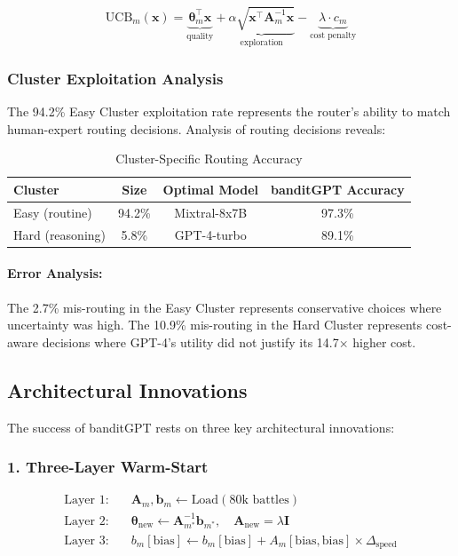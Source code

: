 \documentclass[sigconf]{acmart}
\begin{document}
\begin{equation}
\text{UCB}_m(\mathbf{x}) = \underbrace{\boldsymbol{\theta}_m^\top \mathbf{x}}_{\text{quality}} + \underbrace{\alpha \sqrt{\mathbf{x}^\top \mathbf{A}_m^{-1} \mathbf{x}}}_{\text{exploration}} - \underbrace{\lambda \cdot c_m}_{\text{cost penalty}}
\label{eq:cost_ucb}
\end{equation}

\subsubsection{Cluster Exploitation Analysis}

The 94.2\% Easy Cluster exploitation rate represents the router's ability to match human-expert routing decisions. Analysis of routing decisions reveals:

\begin{table}[h]
\centering
\begin{tabular}{@{}lccc@{}}
\toprule
Cluster & Size & Optimal Model & banditGPT Accuracy \\
\midrule
Easy (routine) & 94.2\% & Mixtral-8x7B & 97.3\% \\
Hard (reasoning) & 5.8\% & GPT-4-turbo & 89.1\% \\
\bottomrule
\end{tabular}
\caption{Cluster-Specific Routing Accuracy}
\label{tab:cluster_accuracy}
\end{table}

\paragraph{Error Analysis:}
The 2.7\% mis-routing in the Easy Cluster represents conservative choices where uncertainty was high. The 10.9\% mis-routing in the Hard Cluster represents cost-aware decisions where GPT-4's utility did not justify its 14.7$\times$ higher cost.

\subsection{Architectural Innovations}

The success of banditGPT rests on three key architectural innovations:

\subsubsection{1. Three-Layer Warm-Start}

\begin{equation}
\begin{aligned}
\text{Layer 1:} \quad & \mathbf{A}_m, \mathbf{b}_m \leftarrow \text{Load}(\text{80k battles}) \\
\text{Layer 2:} \quad & \boldsymbol{\theta}_{\text{new}} \leftarrow \mathbf{A}_{m^*}^{-1} \mathbf{b}_{m^*}, \quad \mathbf{A}_{\text{new}} = \lambda \mathbf{I} \\
\text{Layer 3:} \quad & b_m[\text{bias}] \leftarrow b_m[\text{bias}] + A_m[\text{bias}, \text{bias}] \times \Delta_{\text{speed}}
\end{aligned}
\end{equation}
\end{document}
